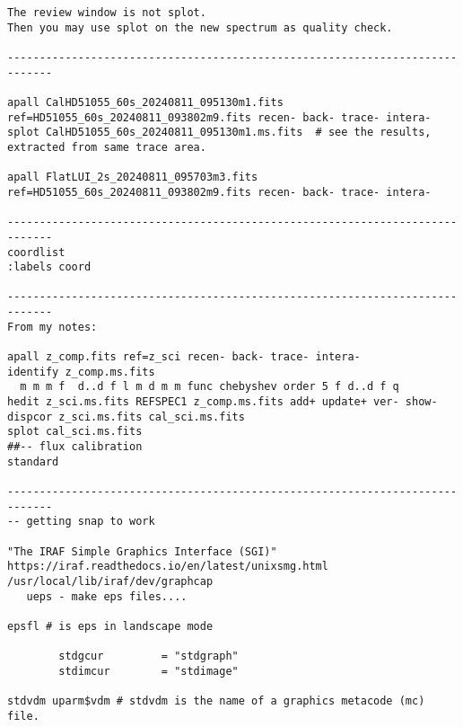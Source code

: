 \begin{verbatim}
The review window is not splot.
Then you may use splot on the new spectrum as quality check.

-----------------------------------------------------------------------------

apall CalHD51055_60s_20240811_095130m1.fits ref=HD51055_60s_20240811_093802m9.fits recen- back- trace- intera-
splot CalHD51055_60s_20240811_095130m1.ms.fits  # see the results, extracted from same trace area.
 
apall FlatLUI_2s_20240811_095703m3.fits ref=HD51055_60s_20240811_093802m9.fits recen- back- trace- intera-

-----------------------------------------------------------------------------
coordlist
:labels coord

-----------------------------------------------------------------------------
From my notes:

apall z_comp.fits ref=z_sci recen- back- trace- intera-
identify z_comp.ms.fits
  m m m f  d..d f l m d m m func chebyshev order 5 f d..d f q
hedit z_sci.ms.fits REFSPEC1 z_comp.ms.fits add+ update+ ver- show-
dispcor z_sci.ms.fits cal_sci.ms.fits
splot cal_sci.ms.fits
##-- flux calibration
standard

-----------------------------------------------------------------------------
-- getting snap to work

"The IRAF Simple Graphics Interface (SGI)"
https://iraf.readthedocs.io/en/latest/unixsmg.html
/usr/local/lib/iraf/dev/graphcap
   ueps - make eps files....

epsfl # is eps in landscape mode

        stdgcur         = "stdgraph"
        stdimcur        = "stdimage"

stdvdm uparm$vdm # stdvdm is the name of a graphics metacode (mc) file.



\end{verbatim}
\endgroup
